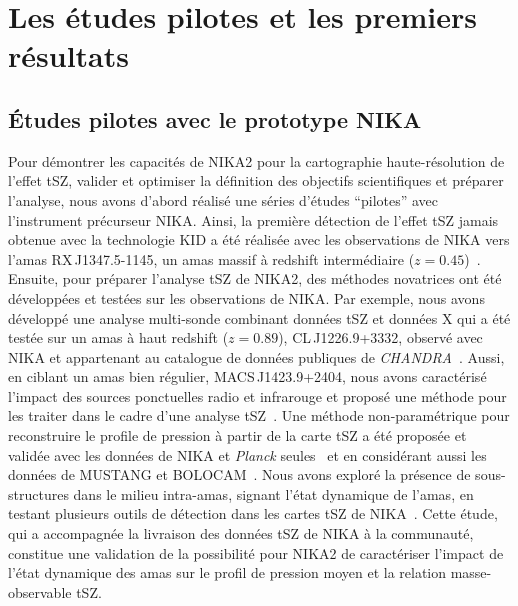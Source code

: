 \section{Les études pilotes et les premiers résultats}
\label{se:NIKANIKA2_SZ}

\subsection{\'Etudes pilotes avec le prototype NIKA}
\label{se:NIKA_SZ}

Pour démontrer les capacités de NIKA2 pour la cartographie
haute-résolution de l'effet tSZ, valider et optimiser la définition
des objectifs scientifiques et préparer l'analyse, nous avons d'abord
réalisé une séries d'études ``pilotes'' avec l'instrument précurseur
NIKA. Ainsi, la première détection de l'effet tSZ jamais obtenue avec
la technologie KID a été réalisée avec les observations de NIKA vers
l'amas RX\,J1347.5-1145, un amas massif à redshift intermédiaire
($z = 0.45$)~\citep{Adam2014}. Ensuite, pour préparer l'analyse tSZ de
NIKA2, des méthodes novatrices ont été développées et testées sur les
observations de NIKA. Par exemple, nous avons développé une analyse
multi-sonde combinant données tSZ et données X qui a été testée sur un
amas à haut redshift ($z = 0.89$), CL\,J1226.9+3332, observé avec NIKA
et appartenant au catalogue de données publiques de
\emph{CHANDRA}~\citep{Adam2015}. Aussi, en ciblant un amas bien régulier,
MACS\,J1423.9+2404, nous avons caractérisé l'impact des sources
ponctuelles radio et infrarouge et proposé une méthode pour les
traiter dans le cadre d'une analyse tSZ~\citep{Adam2016}. Une méthode
non-paramétrique pour reconstruire le profile de pression à partir de
la carte tSZ a été proposée et validée avec les données de NIKA et
\emph{Planck} seules~\citep{Ruppin2017} et en considérant aussi les
données de MUSTANG et BOLOCAM~\citep{Romero2018}. Nous avons exploré
la présence de sous-structures dans le milieu intra-amas, signant
l'état dynamique de l'amas, en testant plusieurs outils de détection
dans les cartes tSZ de NIKA~\citep{Adam2018_sub}. Cette étude, qui a
accompagnée la livraison des données tSZ de NIKA à la communauté,
constitue une validation de la possibilité pour NIKA2 de caractériser
l'impact de l'état dynamique des amas sur le profil de pression moyen
et la relation masse-observable tSZ.

